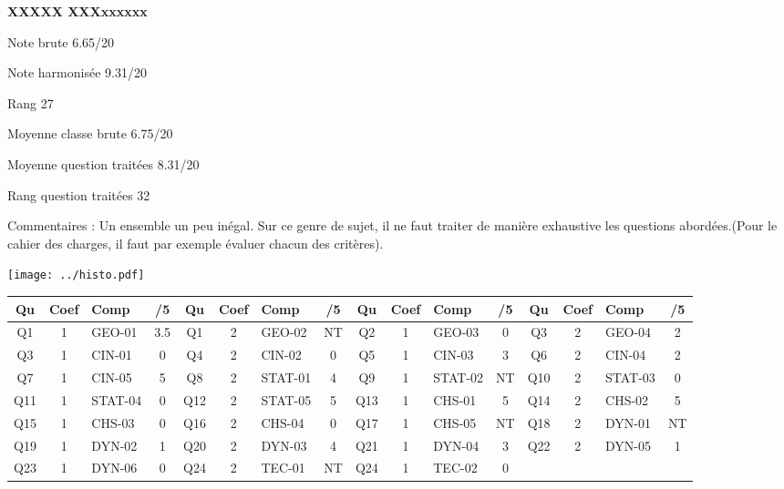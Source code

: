 \begin{minipage}[c]{.45\linewidth} 
\Large \textbf{\textsf{XXXXX XXXxxxxxx}} 
 
 \normalsize Note brute 6.65/20 
 
 \normalsize Note harmonisée 9.31/20 
 
Rang 27
 
Moyenne classe brute 6.75/20 
 
Moyenne question traitées 8.31/20 
 
Rang question traitées 32 
 
Commentaires : 
Un ensemble un peu inégal. Sur ce genre de sujet, il ne faut traiter de manière exhaustive les questions abordées.(Pour le cahier des charges, il faut par exemple évaluer chacun des critères).  
\end{minipage}\hfill 
\begin{minipage}[c]{.45\linewidth}  
\begin{center}
\texttt{[image: ../histo.pdf]} 
\end{center}
\end{minipage}
\footnotesize 
\begin{center} 
\begin{tabular}{|c|c|m{1cm}|c||c|c|m{1cm}|c||c|c|m{1cm}|c||c|c|m{1cm}|c|} 
\hline \textbf{Qu} & \textbf{Coef} & \textbf{Comp} & \textbf{/5} & \textbf{Qu} & \textbf{Coef} & \textbf{Comp} & \textbf{/5} & \textbf{Qu} & \textbf{Coef} & \textbf{Comp} & \textbf{/5} & \textbf{Qu} & \textbf{Coef} & \textbf{Comp} & \textbf{/5} \\ 
\hline 
\hline 
Q1 & 1 & GEO-01 & 3.5 & Q1 & 2 & GEO-02 & NT & Q2 & 1 & GEO-03 & 0 & Q3 & 2 & GEO-04 & 2 \\ \hline 
 
Q3 & 1 & CIN-01 & 0 & Q4 & 2 & CIN-02 & 0 & Q5 & 1 & CIN-03 & 3 & Q6 & 2 & CIN-04 & 2 \\ \hline 
 
Q7 & 1 & CIN-05 & 5 & Q8 & 2 & STAT-01 & 4 & Q9 & 1 & STAT-02 & NT & Q10 & 2 & STAT-03 & 0 \\ \hline 
 
Q11 & 1 & STAT-04 & 0 & Q12 & 2 & STAT-05 & 5 & Q13 & 1 & CHS-01 & 5 & Q14 & 2 & CHS-02 & 5 \\ \hline 
 
Q15 & 1 & CHS-03 & 0 & Q16 & 2 & CHS-04 & 0 & Q17 & 1 & CHS-05 & NT & Q18 & 2 & DYN-01 & NT \\ \hline 
 
Q19 & 1 & DYN-02 & 1 & Q20 & 2 & DYN-03 & 4 & Q21 & 1 & DYN-04 & 3 & Q22 & 2 & DYN-05 & 1 \\ \hline 
 
Q23 & 1 & DYN-06 & 0 & Q24 & 2 & TEC-01 & NT & Q24 & 1 & TEC-02 & 0 &  &  &  &  \\ \hline 
 
\end{tabular} 
\end{center} 
\normalsize 
 
